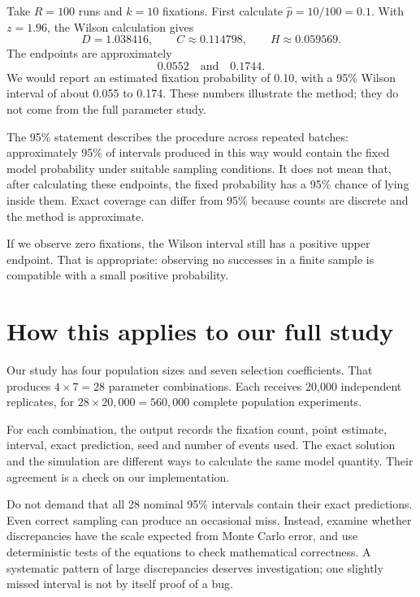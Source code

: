 \begin{workedexample}
Take $R=100$ runs and $k=10$ fixations. First calculate $\widehat p=10/100=0.1$. With $z=1.96$, the Wilson calculation gives
\[
D=1.038416,\qquad C\approx0.114798,\qquad H\approx0.059569.
\]
The endpoints are approximately
\[
0.0552\quad\text{and}\quad0.1744.
\]
We would report an estimated fixation probability of 0.10, with a 95\% Wilson interval of about 0.055 to 0.174. These numbers illustrate the method; they do not come from the full parameter study.
\end{workedexample}

The 95\% statement describes the procedure across repeated batches: approximately 95\% of intervals produced in this way would contain the fixed model probability under suitable sampling conditions. It does not mean that, after calculating these endpoints, the fixed probability has a 95\% chance of lying inside them. Exact coverage can differ from 95\% because counts are discrete and the method is approximate.

If we observe zero fixations, the Wilson interval still has a positive upper endpoint. That is appropriate: observing no successes in a finite sample is compatible with a small positive probability.

\section{How this applies to our full study}

Our study has four population sizes and seven selection coefficients. That produces $4\times7=28$ parameter combinations. Each receives 20,000 independent replicates, for $28\times20{,}000=560{,}000$ complete population experiments.

For each combination, the output records the fixation count, point estimate, interval, exact prediction, seed and number of events used. The exact solution and the simulation are different ways to calculate the same model quantity. Their agreement is a check on our implementation.

Do not demand that all 28 nominal 95\% intervals contain their exact predictions. Even correct sampling can produce an occasional miss. Instead, examine whether discrepancies have the scale expected from Monte Carlo error, and use deterministic tests of the equations to check mathematical correctness. A systematic pattern of large discrepancies deserves investigation; one slightly missed interval is not by itself proof of a bug.

